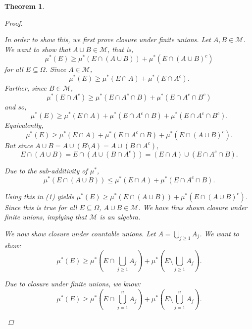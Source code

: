 \documentclass{article}
\newcommand{\M}{\mathcal{M}}
\theoremstyle{spaced}
\newtheorem{theorem}{Theorem}[section]
\begin{document}
\begin{theorem}
\begin{proof}
\begin{enumerate}
\begin{enumerate}
            \vspace{1em}
            
            In order to show this, we first prove closure under finite unions. Let $A, B \in \M$. We want to show that $A\cup B \in \M$, that is,
                \[ \mu^*(E) \geq \mu^*(E \cap(A \cup B)) + \mu^*(E \cap (A \cup B)^c)\]
            for all $E \subseteq \Omega$. 
            Since $A \in \M$, 
            \begin{equation*}
                \mu^*(E) \geq \mu^*(E \cap A) + \mu^*(E \cap A^c).
            \end{equation*} 
            Further, since $B \in \M$, 
            \begin{equation*}
                \mu^*(E \cap A^c) \geq \mu^*(E \cap A^c \cap B) + \mu^*(E \cap A^c \cap B^c)
            \end{equation*} 
            and so,             
                \[ \mu^*(E) \geq \mu^*(E \cap A) + \mu^*(E \cap A^c \cap B) + \mu^*(E \cap A^c \cap B^c).\]
            Equivalently,  
                \begin{equation}
                    \mu^*(E) \geq \mu^*(E \cap A) + \mu^*(E \cap A^c \cap B) + \mu^*(E \cap (A \cup B)^c).
                \end{equation}
            But since $A \cup B = A \cup (B \setminus A) = A \cup (B \cap A^c)$, 
            \[ E \cap (A \cup B) = E \cap (A \cup (B \cap A^c)) = (E \cap A) \cup (E \cap A^c \cap B). \] 
            
            Due to the sub-additivity of $\mu^*$,  
                \[ \mu^*(E \cap (A \cup B)) \leq \mu^*(E \cap A) + \mu^*(E \cap A^c \cap B). \]
            
            Using this in (1) yields $\mu^*(E) \geq \mu^*(E \cap (A \cup B)) + \mu^*(E \cap (A \cup B)^c)$. Since this is true for all $E \subseteq \Omega$, $A \cup B \in \M$. We have thus shown closure under finite unions, implying that $\M$ is an algebra. 

            \vspace{1em}

            We now show closure under countable unions. Let $A = \bigcup_{j \geq 1} A_j$. We want to show: 
                \[ \mu^*(E) \geq \mu^*\left(E \cap \bigcup_{j \geq 1} A_j \right) + \mu^*\left( E \setminus \bigcup_{j \geq 1} A_j\right).\]

            Due to closure under finite unions, we know:
                \[ \mu^*(E) \geq \mu^*\left( E \cap \bigcup_{j = 1}^n A_j \right) +  \mu^*\left( E \setminus \bigcup_{j = 1}^{n} A_j\right).\]


\end{enumerate}
\end{enumerate}
\end{proof}
\end{theorem}
\end{document}
